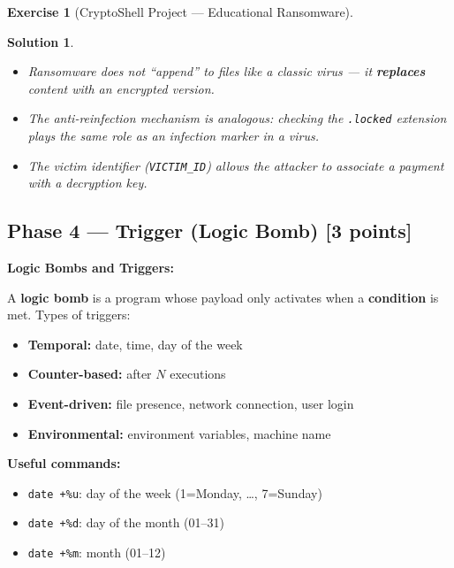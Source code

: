 \documentclass[a4paper,11pt]{article}
\theoremstyle{plain}
\newtheorem{correction}{Solution}
\theoremstyle{definition}
\newtheorem{exercice}{Exercise}
\begin{document}
\begin{exercice}[CryptoShell Project --- Educational Ransomware]
\begin{correction}
\begin{pointcle}
\begin{itemize}
    \item Ransomware does not ``append'' to files like a classic virus --- it \textbf{replaces} content with an encrypted version.
    \item The anti-reinfection mechanism is analogous: checking the \texttt{.locked} extension plays the same role as an infection marker in a virus.
    \item The victim identifier (\texttt{VICTIM\_ID}) allows the attacker to associate a payment with a decryption key.
\end{itemize}
\end{pointcle}

\end{correction}



\subsection*{Phase 4 --- Trigger (Logic Bomb) \hfill \normalsize [3 points]}

\begin{rappel}
\textbf{Logic Bombs and Triggers:}

A \textbf{logic bomb} is a program whose payload only activates when a \textbf{condition} is met. Types of triggers:
\begin{itemize}
    \item \textbf{Temporal:} date, time, day of the week
    \item \textbf{Counter-based:} after $N$ executions
    \item \textbf{Event-driven:} file presence, network connection, user login
    \item \textbf{Environmental:} environment variables, machine name
\end{itemize}

\medskip
\textbf{Useful commands:}
\begin{itemize}
    \item \texttt{date +\%u}: day of the week (1=Monday, \ldots, 7=Sunday)
    \item \texttt{date +\%d}: day of the month (01--31)
    \item \texttt{date +\%m}: month (01--12)
\end{itemize}


\end{rappel}
\end{exercice}
\end{document}
